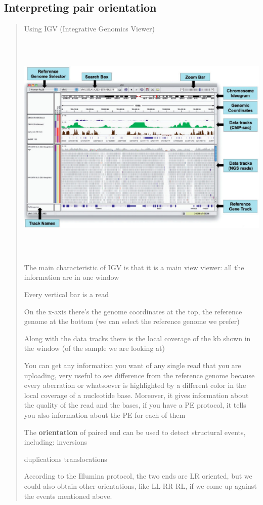 \hypertarget{interpreting-pair-orientation}{%
\subsection{Interpreting pair
orientation}\label{interpreting-pair-orientation}}

\begin{quote}
Using IGV (Integrative Genomics Viewer)

\includegraphics[width=6.32631in,height=4.35875in]{image19.jpeg}

The main characteristic of IGV is that it is a main view viewer: all the
information are in one window

Every vertical bar is a read

On the x-axis there's the genome coordinates at the top, the reference
genome at the bottom (we can select the reference genome we prefer)

Along with the data tracks there is the local coverage of the kb shown
in the window (of the sample we are looking at)

You can get any information you want of any single read that you are
uploading, very useful to see difference from the reference genome
because every aberration or whatsoever is highlighted by a different
color in the local coverage of a nucleotide base. Moreover, it gives
information about the quality of the read and the bases, if you have a
PE protocol, it tells you also information about the PE for each of them

The \textbf{orientation} of paired end can be used to detect structural
events, including: inversions

duplications translocations

According to the Illumina protocol, the two ends are LR oriented, but we
could also obtain other orientations, like LL RR RL, if we come up
against the events mentioned above.
\end{quote}

